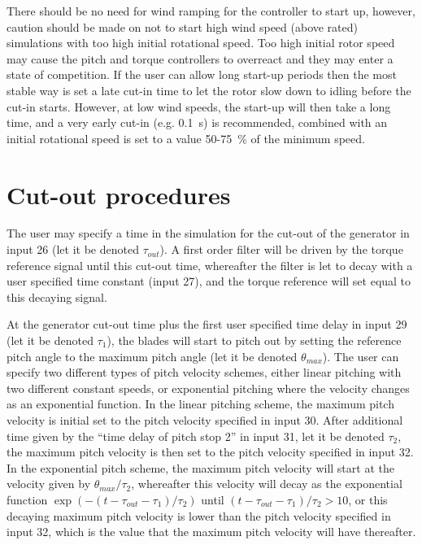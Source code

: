 There should be no need for wind ramping for the controller to start up, however, caution should be made on not to start high wind speed (above rated) simulations with too high initial rotational speed. Too high initial rotor speed may cause the pitch and torque controllers to overreact and they may enter a state of competition. If the user can allow long start-up periods then the most stable way is set a late cut-in time to let the rotor slow down to idling before the cut-in starts. However, at low wind speeds, the start-up will then take a long time, and a very early cut-in (e.g. 0.1~s) is recommended, combined with an initial rotational speed is set to a value 50-75~\% of the minimum speed.


\section{Cut-out procedures} \label{s:cutout}

The user may specify a time in the simulation for the cut-out of the generator in input 26 (let it be denoted $\tau_{out}$). A first order filter will be driven by the torque reference signal until this cut-out time, whereafter the filter is let to decay with a user specified time constant (input 27), and the torque reference will set equal to this decaying signal.

At the generator cut-out time plus the first user specified time delay in input 29 (let it be denoted $\tau_1$), the blades will start to pitch out by setting the reference pitch angle to the maximum pitch angle (let it be denoted $\theta_{max}$). The user can specify two different types of pitch velocity schemes, either linear pitching with two different constant speeds, or exponential pitching where the velocity changes as an exponential function. In the linear pitching scheme, the maximum pitch velocity is initial set to the pitch velocity specified in input 30. After additional time given by the ``time delay of pitch stop 2'' in input 31, let it be denoted $\tau_2$, the maximum pitch velocity is then set to the pitch velocity specified in input 32. In the exponential pitch scheme, the maximum pitch velocity will start at the velocity given by $\theta_{max}/\tau_2$, whereafter this velocity will decay as the exponential function $\exp\left(-(t-\tau_{out}-\tau_1)/\tau_2\right)$ until $(t-\tau_{out}-\tau_1)/\tau_2>10$, or this decaying maximum pitch velocity is lower than the pitch velocity specified in input 32, which is the value that the maximum pitch velocity will have thereafter.

